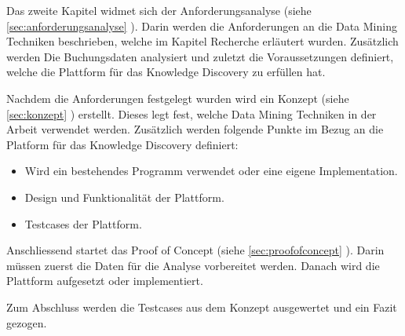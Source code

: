 Das zweite Kapitel widmet sich der Anforderungsanalyse (siehe \cref{sec:anforderungsanalyse} ). Darin werden die Anforderungen an die Data Mining Techniken beschrieben, welche im Kapitel Recherche erläutert wurden. Zusätzlich werden Die Buchungsdaten analysiert und zuletzt die Voraussetzungen definiert, welche die Plattform für das Knowledge Discovery zu erfüllen hat.

Nachdem die Anforderungen festgelegt wurden wird ein Konzept (siehe \cref{sec:konzept} ) erstellt. Dieses legt fest, welche Data Mining Techniken in der Arbeit verwendet werden. Zusätzlich werden folgende Punkte im Bezug an die Platform für das Knowledge Discovery definiert:
\begin{itemize}
	\item Wird ein bestehendes Programm verwendet oder eine eigene Implementation.
	\item Design und Funktionalität der Plattform.
	\item Testcases der Plattform.
\end{itemize}

Anschliessend startet das Proof of Concept (siehe \cref{sec:proofofconcept} ). Darin müssen zuerst die Daten für die Analyse vorbereitet werden. Danach wird die Plattform aufgesetzt oder implementiert.

Zum Abschluss werden die Testcases aus dem Konzept ausgewertet und ein Fazit gezogen.

